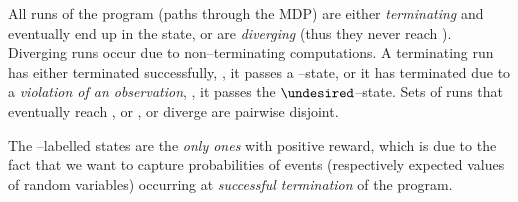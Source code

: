 All runs of the program (paths through the MDP) are either \emph{terminating} and eventually end up in the \sink state, or are \emph{diverging} (thus they never reach \sink).
Diverging runs occur due to non--terminating computations.
A terminating run has either terminated successfully, \ie, it passes a \exit--state, or it has terminated due to a \emph{violation of an observation}, \ie, it passes the $\undesired$--state.
Sets of runs that eventually reach \undesired, or \sink, or diverge are pairwise disjoint. 

\noindent The \exit--labelled states are the \emph{only ones} with positive reward, which is due to the fact that we want to capture probabilities of events (respectively expected values of random variables) occurring at \emph{successful termination} of the program.

